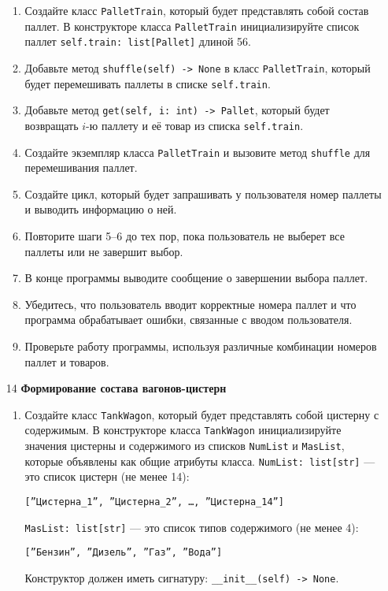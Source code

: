 \begin{enumerate}
\begin{enumerate}
    \item Создайте класс \texttt{PalletTrain}, который будет представлять собой состав паллет. В конструкторе класса \texttt{PalletTrain} инициализируйте список паллет \texttt{self.train: list[Pallet]} длиной 56.

    \item Добавьте метод \texttt{shuffle(self) -> None} в класс \texttt{PalletTrain}, который будет перемешивать паллеты в списке \texttt{self.train}.

    \item Добавьте метод \texttt{get(self, i: int) -> Pallet}, который будет возвращать $i$-ю паллету и её товар из списка \texttt{self.train}.

    \item Создайте экземпляр класса \texttt{PalletTrain} и вызовите метод \texttt{shuffle} для перемешивания паллет.

    \item Создайте цикл, который будет запрашивать у пользователя номер паллеты и выводить информацию о ней.

    \item Повторите шаги 5–6 до тех пор, пока пользователь не выберет все паллеты или не завершит выбор.

    \item В конце программы выводите сообщение о завершении выбора паллет.

    \item Убедитесь, что пользователь вводит корректные номера паллет и что программа обрабатывает ошибки, связанные с вводом пользователя.

    \item Проверьте работу программы, используя различные комбинации номеров паллет и товаров.
\end{enumerate}

\item[14] \textbf{Формирование состава вагонов-цистерн}
\begin{enumerate}
    \item Создайте класс \texttt{TankWagon}, который будет представлять собой цистерну с содержимым. В конструкторе класса \texttt{TankWagon} инициализируйте значения цистерны и содержимого из списков \texttt{NumList} и \texttt{MasList}, которые объявлены как общие атрибуты класса. \texttt{NumList: list[str]} — это список цистерн (не менее 14): 
    \begin{center}
        \texttt{[''Цистерна\_1'', ''Цистерна\_2'', \dots, ''Цистерна\_14'']}
    \end{center}
    \texttt{MasList: list[str]} — это список типов содержимого (не менее 4):
    \begin{center}
        \texttt{[''Бензин'', ''Дизель'', ''Газ'', ''Вода'']}
    \end{center}
    Конструктор должен иметь сигнатуру: \texttt{\_\_init\_\_(self) -> None}.


\end{enumerate}
\end{enumerate}
